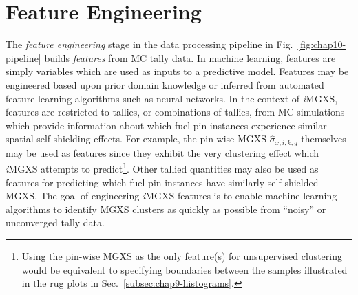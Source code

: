 

\section{Feature Engineering}
\label{sec:chap10-feature-engineer}

The \textit{feature engineering} stage in the data processing pipeline in Fig.~\ref{fig:chap10-pipeline} builds \textit{features} from \ac{MC} tally data. In machine learning, features are simply variables which are used as inputs to a predictive model. Features may be engineered based upon prior domain knowledge or inferred from automated feature learning algorithms such as neural networks. In the context of \textit{i}\ac{MGXS}, features are restricted to tallies, or combinations of tallies, from \ac{MC} simulations which provide information about which fuel pin instances experience similar spatial self-shielding effects. For example, the pin-wise \ac{MGXS} $\hat{\sigma}_{x,i,k,g}$ themselves may be used as features since they exhibit the very clustering effect which \textit{i}\ac{MGXS} attempts to predict\footnote{Using the pin-wise \ac{MGXS} as the only feature(s) for unsupervised clustering would be equivalent to specifying boundaries between the samples illustrated in the rug plots in Sec.~\ref{subsec:chap9-histograms}.}. Other tallied quantities may also be used as features for predicting which fuel pin instances have similarly self-shielded \ac{MGXS}. The goal of engineering \textit{i}\ac{MGXS} features is to enable machine learning algorithms to identify \ac{MGXS} clusters as quickly as possible from ``noisy'' or unconverged tally data.

